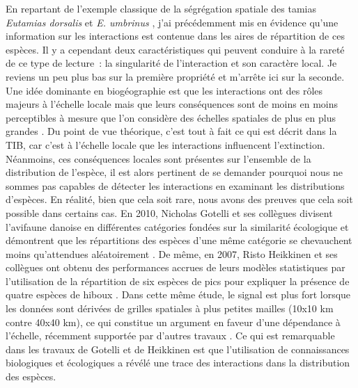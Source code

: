 En repartant de l'exemple classique de la ségrégation spatiale des
tamias \emph{Eutamias dorsalis} et \emph{E. umbrinus} \citep{Brown1971},
j'ai précédemment mis en évidence qu'une information sur les
interactions est contenue dans les aires de répartition de ces espèces.
Il y a cependant deux caractéristiques qui peuvent conduire à la rareté
de ce type de lecture~: la singularité de l'interaction et son caractère
local. Je reviens un peu plus bas sur la première propriété et m'arrête
ici sur la seconde. Une idée dominante en biogéographie est que les
interactions ont des rôles majeurs à l'échelle locale mais que leurs
conséquences sont de moins en moins perceptibles à mesure que l'on
considère des échelles spatiales de plus en plus grandes \citep[voir
l'unique figure de][]{McGill2010}. Du point de vue théorique, c'est tout
à fait ce qui est décrit dans la TIB, car c'est à l'échelle locale que
les interactions influencent l'extinction. Néanmoins, ces conséquences
locales sont présentes sur l'ensemble de la distribution de l'espèce, il
est alors pertinent de se demander pourquoi nous ne sommes pas capables
de détecter les interactions en examinant les distributions d'espèces.
En réalité, bien que cela soit rare, nous avons des preuves que cela
soit possible dans certains cas. En 2010, Nicholas Gotelli et ses
collègues divisent l'avifaune danoise en différentes catégories fondées
sur la similarité écologique et démontrent que les répartitions des
espèces d'une même catégorie se chevauchent moins qu'attendues
aléatoirement \citep{Gotelli2010}. De même, en 2007, Risto Heikkinen et
ses collègues ont obtenu des performances accrues de leurs modèles
statistiques par l'utilisation de la répartition de six espèces de pics
pour expliquer la présence de quatre espèces de hiboux
\citep{Heikkinen2007}. Dans cette même étude, le signal est plus fort
lorsque les données sont dérivées de grilles spatiales à plus petites
mailles (10x10 km contre 40x40 km), ce qui constitue un argument en
faveur d'une dépendance à l'échelle, récemment supportée par d'autres
travaux \citep{Belmaker2015}. Ce qui est remarquable dans les travaux de
Gotelli et de Heikkinen est que l'utilisation de connaissances
biologiques et écologiques a révélé une trace des interactions dans la
distribution des espèces.


